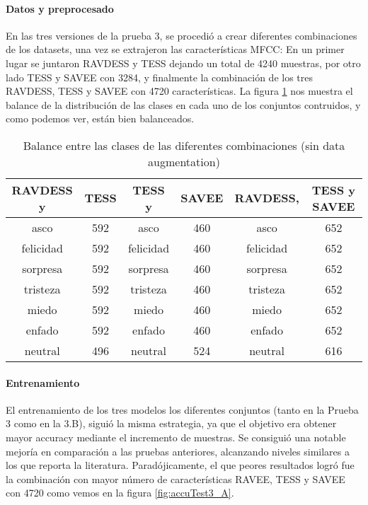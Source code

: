 \documentclass[11pt,a4paper,spanish]{book}
\begin{document}
	\paragraph{Datos y preprocesado} En las tres versiones de la prueba 3, se procedió a crear diferentes combinaciones de los datasets, una vez se extrajeron las características MFCC: En un primer lugar se juntaron RAVDESS y TESS dejando un total de 4240 muestras, por otro lado TESS y SAVEE con 3284, y finalmente la combinación de los tres RAVDESS, TESS y SAVEE con 4720 características. La figura \ref{ref:balanceTest3} nos muestra el balance de la distribución de las clases en cada uno de los conjuntos contruidos, y como podemos ver, están bien balanceados.
	\begin{table}[H]
		\centering
		\begin{center}
			
				\begin{tabular}{ c  c | c  c |c  c }
					RAVDESS y &TESS & TESS y &SAVEE & RAVDESS, &TESS y SAVEE \\
					\hline
					asco 		& 592 & asco 		& 460 & asco 		& 652\\
					felicidad 	& 592 & felicidad 	& 460 & felicidad 	& 652\\
					sorpresa 	& 592 & sorpresa 	& 460 & sorpresa 	& 652\\
					tristeza 	& 592 & tristeza 	& 460 & tristeza 	& 652\\
					miedo 		& 592 & miedo 		& 460 & miedo 		& 652\\
					enfado 		& 592 & enfado 		& 460 & enfado 		& 652\\
					neutral 	& 496 & neutral 	& 524 & neutral 	& 616\\
					\hline
				\end{tabular}
				
			\caption{Balance entre las clases de las diferentes combinaciones (sin data augmentation)}
			\label{ref:balanceTest3}
		\end{center}
	\end{table}

	\paragraph{Entrenamiento}
	El entrenamiento de los tres modelos los diferentes conjuntos (tanto en la Prueba 3 como en la 3.B), siguió la misma estrategia, ya que el objetivo era obtener mayor accuracy mediante el incremento de muestras. Se consiguió una notable mejoría en comparación a las pruebas anteriores, alcanzando niveles similares a los que reporta la literatura.
	Paradójicamente, el que peores resultados logró fue la combinación con mayor número de características RAVEE, TESS y SAVEE con 4720 como vemos en la figura \ref{fig:accuTest3_A}.
	
\end{document}
